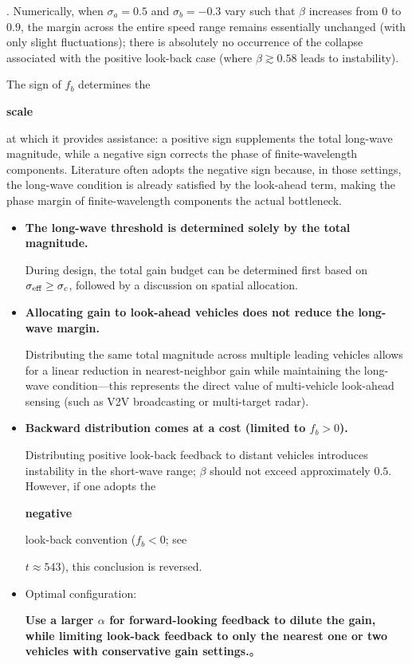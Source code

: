 \documentclass[11pt,a4paper,openany]{book}
\numberwithin{equation}{chapter}
\numberwithin{figure}{chapter}
\numberwithin{table}{chapter}
\begin{document}
. Numerically, when $\sigma_a=0.5$ and $\sigma_b=-0.3$ vary such that $\beta$ increases from $0$ to $0.9$, the margin across the entire speed range remains essentially unchanged (with only slight fluctuations); there is absolutely no occurrence of the collapse associated with the positive look-back case (where $\beta\gtrsim0.58$ leads to instability).



\begin{tcolorbox}[notebox,title=\textbf{Summary}]
The sign of $f_b$ determines the

\textbf{scale}

at which it provides assistance: a positive sign supplements the total long-wave magnitude, while a negative sign corrects the phase of finite-wavelength components. Literature often adopts the negative sign because, in those settings, the long-wave condition is already satisfied by the look-ahead term, making the phase margin of finite-wavelength components the actual bottleneck.


\end{tcolorbox}

\begin{tcolorbox}[notebox,title=\textbf{Engineering Conclusion}]
\begin{itemize}[leftmargin=1.2em,itemsep=3pt]
\item \textbf{The long-wave threshold is determined solely by the total magnitude.}

During design, the total gain budget can be determined first based on $\sigma_{\rm eff}\ge\sigma_c$, followed by a discussion on spatial allocation.


\item \textbf{Allocating gain to look-ahead vehicles does not reduce the long-wave margin.}

Distributing the same total magnitude across multiple leading vehicles allows for a linear reduction in nearest-neighbor gain while maintaining the long-wave condition—this represents the direct value of multi-vehicle look-ahead sensing (such as V2V broadcasting or multi-target radar).\item \textbf{Backward distribution comes at a cost (limited to $f_b>0$).}

Distributing positive look-back feedback to distant vehicles introduces instability in the short-wave range; $\beta$ should not exceed approximately $0.5$. However, if one adopts the

\textbf{negative}

look-back convention ($f_b<0$; see

$t\approx543$), this conclusion is reversed.


\item

Optimal configuration:

\textbf{Use a larger $\alpha$ for forward-looking feedback to dilute the gain, while limiting look-back feedback to only the nearest one or two vehicles with conservative gain settings.}。
\end{itemize}
\end{tcolorbox}
\end{document}
